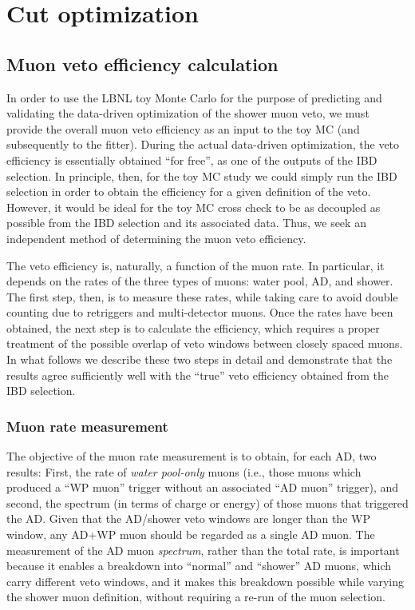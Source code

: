 \documentclass[../thesis.tex]{subfiles}
\begin{document}
\chapter{Cut optimization}
\label{chap:cutOptim}

\section{Muon veto efficiency calculation}
\label{sec:cutOptimMuVetoEff}

In order to use the LBNL toy Monte Carlo for the purpose of predicting and validating the data-driven optimization of the shower muon veto, we must provide the overall muon veto efficiency as an input to the toy MC (and subsequently to the fitter). During the actual data-driven optimization, the veto efficiency is essentially obtained ``for free'', as one of the outputs of the IBD selection. In principle, then, for the toy MC study we could simply run the IBD selection in order to obtain the efficiency for a given definition of the veto. However, it would be ideal for the toy MC cross check to be as decoupled as possible from the IBD selection and its associated data. Thus, we seek an independent method of determining the muon veto efficiency.

The veto efficiency is, naturally, a function of the muon rate. In particular, it depends on the rates of the three types of muons: water pool, AD, and shower. The first step, then, is to measure these rates, while taking care to avoid double counting due to retriggers and multi-detector muons. Once the rates have been obtained, the next step is to calculate the efficiency, which requires a proper treatment of the possible overlap of veto windows between closely spaced muons. In what follows we describe these two steps in detail and demonstrate that the results agree sufficiently well with the ``true'' veto efficiency obtained from the IBD selection.

\subsection{Muon rate measurement}
\label{sec:cutOptimMuRate}

The objective of the muon rate measurement is to obtain, for each AD, two results: First, the rate of \emph{water pool-only} muons (i.e., those muons which produced a ``WP muon'' trigger without an associated ``AD muon'' trigger), and second, the spectrum (in terms of charge or energy) of those muons that triggered the AD. Given that the AD/shower veto windows are longer than the WP window, any AD+WP muon should be regarded as a single AD muon. The measurement of the AD muon \emph{spectrum}, rather than the total rate, is important because it enables a breakdown into ``normal'' and ``shower'' AD muons, which carry different veto windows, and it makes this breakdown possible while varying the shower muon definition, without requiring a re-run of the muon selection.



\begin{comment}
  XXX local slides from mid-late Oct for retrigger plots. See misc_ana/MuonVetoEff/condenser4retrig.
\end{comment}
\end{document}
